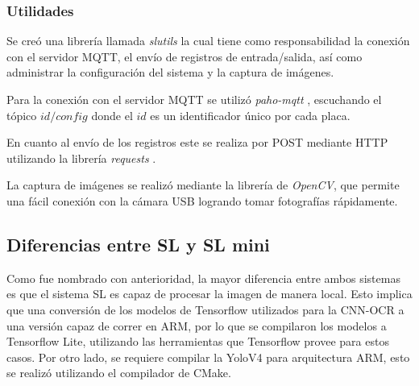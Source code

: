 \subsubsection{Utilidades}

Se creó una librería llamada \textit{slutils} la cual tiene como responsabilidad la conexión con el servidor MQTT, el envío de registros de entrada/salida, así como administrar la configuración del sistema y la captura de imágenes.

Para la conexión con el servidor MQTT se utilizó \textit{paho-mqtt} \cite{craggs_documentacion_nodate}, escuchando el tópico \textit{$id/config$} donde el $id$ es un identificador único por cada placa.

En cuanto al envío de los registros este se realiza por POST mediante HTTP utilizando la librería \textit{requests} \cite{python_software_foundation_documentacion_nodate}.

La captura de imágenes se realizó mediante la librería de \textit{OpenCV}, que permite una fácil conexión con la cámara USB logrando tomar fotografías rápidamente.

\subsection{Diferencias entre SL y SL mini}

Como fue nombrado con anterioridad, la mayor diferencia entre ambos sistemas es que el sistema SL es capaz de procesar la imagen de manera local. Esto implica que una conversión de los modelos de Tensorflow \cite{google_tensorflow_nodate} utilizados para la CNN-OCR a una versión capaz de correr en ARM, por lo que se compilaron los modelos a Tensorflow Lite, utilizando las herramientas que Tensorflow provee para estos casos. Por otro lado, se requiere compilar la YoloV4 para arquitectura ARM, esto se realizó utilizando el compilador de CMake.

